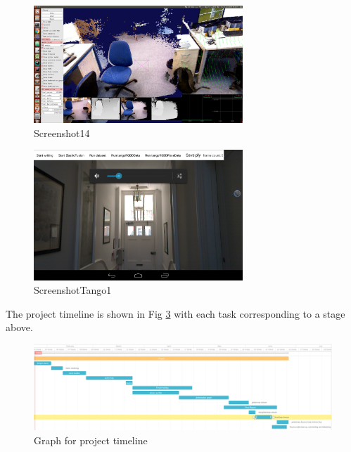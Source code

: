 \documentclass[12pt,twoside]{article}
\begin{document}
\begin{figure}[h]
    \centering
    \includegraphics[width=0.7\textwidth]{figures/Screenshot14}
    \caption{Screenshot14}
    \label{fig:Screenshot14}
\end{figure}



\begin{figure}[h]
    \centering
    \includegraphics[width=0.7\textwidth]{figures/ScreenshotTango1}
    \caption{ScreenshotTango1}
    \label{fig:ScreenshotTango1}
\end{figure}




\newpage


The project timeline is shown in Fig \ref{fig:tiemline2} with each task corresponding to a stage above.

\begin{figure}
\centering
    \includegraphics[angle=90,width=\textwidth,height=\textheight,keepaspectratio]{figures/timeline2}
   \caption{Graph for project timeline}
    \label{fig:tiemline2}
\end{figure}
\end{document}
